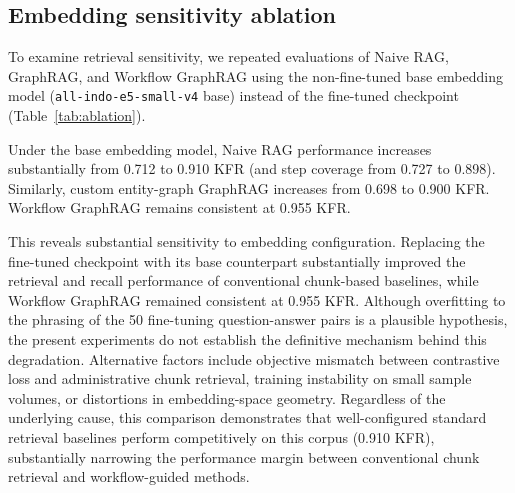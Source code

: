 \documentclass[preprint,10pt]{elsarticle}
\begin{document}
\subsection{Embedding sensitivity ablation}
\label{sec:ablation-embedding}
To examine retrieval sensitivity, we repeated evaluations of Naive RAG, GraphRAG, and Workflow GraphRAG using the non-fine-tuned base embedding model (\texttt{all-indo-e5-small-v4} base) instead of the fine-tuned checkpoint (Table~\ref{tab:ablation}).

\begin{table}[!htbp]
\centering
\caption{Ablation evaluating fine-tuned (v3) versus non-fine-tuned base embedding representations: key-fact recall and step coverage across primary systems.}
\label{tab:ablation}
\small

\end{table}

Under the base embedding model, Naive RAG performance increases substantially from 0.712 to 0.910 KFR (and step coverage from 0.727 to 0.898). Similarly, custom entity-graph GraphRAG increases from 0.698 to 0.900 KFR. Workflow GraphRAG remains consistent at 0.955 KFR.

This reveals substantial sensitivity to embedding configuration. Replacing the fine-tuned checkpoint with its base counterpart substantially improved the retrieval and recall performance of conventional chunk-based baselines, while Workflow GraphRAG remained consistent at 0.955 KFR. Although overfitting to the phrasing of the 50 fine-tuning question-answer pairs is a plausible hypothesis, the present experiments do not establish the definitive mechanism behind this degradation. Alternative factors include objective mismatch between contrastive loss and administrative chunk retrieval, training instability on small sample volumes, or distortions in embedding-space geometry. Regardless of the underlying cause, this comparison demonstrates that well-configured standard retrieval baselines perform competitively on this corpus (0.910 KFR), substantially narrowing the performance margin between conventional chunk retrieval and workflow-guided methods.
\end{document}
